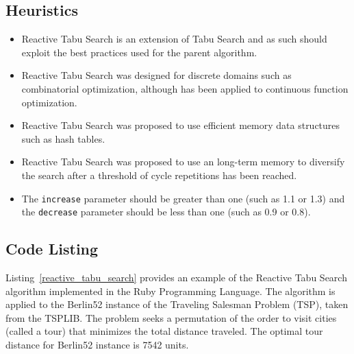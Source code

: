 \subsection{Heuristics}
\begin{itemize}
	\item Reactive Tabu Search is an extension of Tabu Search and as such should exploit the best practices used for the parent algorithm.
	\item Reactive Tabu Search was designed for discrete domains such as combinatorial optimization, although has been applied to continuous function optimization.
	\item Reactive Tabu Search was proposed to use efficient memory data structures such as hash tables.
	\item Reactive Tabu Search was proposed to use an long-term memory to diversify the search after a threshold of cycle repetitions has been reached.
	\item The \texttt{increase} parameter should be greater than one (such as 1.1 or 1.3) and the \texttt{decrease} parameter should be less than one (such as 0.9 or 0.8).
\end{itemize}

\subsection{Code Listing}
Listing~\ref{reactive_tabu_search} provides an example of the Reactive Tabu Search algorithm implemented in the Ruby Programming Language. 
The algorithm is applied to the Berlin52 instance of the Traveling Salesman Problem (TSP), taken from the TSPLIB. The problem seeks a permutation of the order to visit cities (called a tour) that minimizes the total distance traveled. The optimal tour distance for Berlin52 instance is 7542 units.

